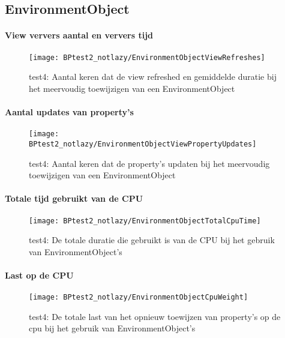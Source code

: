 \subsection{EnvironmentObject}
\paragraph{View ververs aantal en ververs tijd}
\begin{figure}[H]
    \centering
    \texttt{[image: BPtest2\_notlazy/EnvironmentObjectViewRefreshes]} 
    \caption{test4: Aantal keren dat de view refreshed en gemiddelde duratie bij het meervoudig toewijzigen van een EnvironmentObject}
    \label{fig:viewRefreshesEnvironmentObject3}
\end{figure}
\paragraph{Aantal updates van property's}
\begin{figure}[H]
    \centering
    \texttt{[image: BPtest2\_notlazy/EnvironmentObjectViewPropertyUpdates]} 
    \caption{test4: Aantal keren dat de property's updaten bij het meervoudig toewijzigen van een EnvironmentObject}
    \label{fig:propertyUpdatesEnvironmentObject3}
\end{figure}
\paragraph{Totale tijd gebruikt van de CPU}
\begin{figure}[H]
    \centering
    \texttt{[image: BPtest2\_notlazy/EnvironmentObjectTotalCpuTime]} 
    \caption{test4: De totale duratie die gebruikt is van de CPU bij het gebruik van EnvironmentObject's}
    \label{fig:cpuUsageTimeEnvironmentObject3}
\end{figure}
\paragraph{Last op de CPU}
\begin{figure}[H]
    \centering
    \texttt{[image: BPtest2\_notlazy/EnvironmentObjectCpuWeight]} 
    \caption{test4: De totale last van het opnieuw toewijzen van property's op de cpu bij het gebruik van EnvironmentObject's}
    \label{fig:cpuWeightEnvironmentObject3}
\end{figure}
